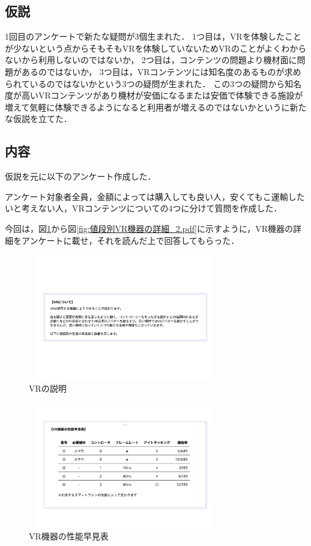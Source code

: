\documentclass[12pt,a4j]{ltjsarticle}
\begin{document}
\subsection{仮説}
1回目のアンケートで新たな疑問が3個生まれた．
1つ目は，VRを体験したことが少ないという点からそもそもVRを体験していないためVRのことがよくわからないから利用しないのではないか，
2つ目は，コンテンツの問題より機材面に問題があるのではないか，
3つ目は，VRコンテンツには知名度のあるものが求められているのではないかという3つの疑問が生まれた．
この3つの疑問から知名度が高いVRコンテンツがあり機材が安価になるまたは安価で体験できる施設が増えて気軽に体験できるようになると利用者が増えるのではないかというに新たな仮説を立てた．

\subsection{内容}
仮説を元に以下のアンケート作成した．

アンケート対象者全員，金額によっては購入しても良い人，安くてもこ運輸したいと考えない人，VRコンテンツについての4つに分けて質問を作成した．

今回は，図\ref{fig:VRについての説明.pdf}から図\ref{fig:値段別VR機器の詳細_2.pdf}に示すように，VR機器の詳細をアンケートに載せ，それを読んだ上で回答してもらった．

\begin{figure}[h]
\begin{center}
\includegraphics[clip,width=85mm,height=55mm]{VRについての説明.pdf}
\end{center}
 \caption{VRの説明}
 \label{fig:VRについての説明.pdf}
\end{figure}

\begin{figure}[h]
\begin{center}
 \includegraphics[clip,width=85mm,height=55mm]{VR機器の性能早見表.pdf}
\end{center}
 \caption{VR機器の性能早見表}
 \label{fig:VR機器の性能早見表.pdf}
\end{figure}
\end{document}
